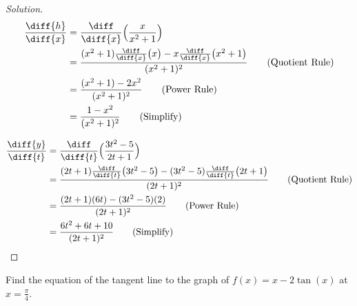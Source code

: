 \documentclass[crop=false,class=book,oneside]{standalone}                      %
\begin{document}
            \begin{proof}[Solution]
                \par\hfill\par
                \begin{minipage}[b]{.49\textwidth}
                    \centering
                    \begin{align*}
                        \frac{\diff{h}}{\diff{x}}
                        &=\frac{\diff}{\diff{x}}
                            \Big(\frac{x}{x^{2}+1}\Big)\\
                        &=\frac{(x^{2}+1)\frac{\diff}{\diff{x}}
                            \big(x\big)-x\frac{\diff}{\diff{x}}
                            \big(x^{2}+1\big)}
                              {(x^{2}+1)^{2}}
                            \tag{Quotient Rule}\\
                        &=\frac{(x^{2}+1)-2x^{2}}{(x^{2}+1)^{2}}
                            \tag{Power Rule}\\
                        &=\frac{1-x^{2}}{(x^{2}+1)^{2}}
                            \tag{Simplify}
                    \end{align*}
                \end{minipage}
                \hfill
                \vline
                \begin{minipage}[b]{.49\textwidth}
                    \centering
                    \begin{align*}
                        \frac{\diff{y}}{\diff{t}}
                        &=\frac{\diff}{\diff{t}}
                            \Big(\frac{3t^{2}-5}{2t+1}\Big)\\
                        &=\frac{(2t+1)\frac{\diff}{\diff{t}}
                                \big(3t^{2}-5\big)-(3t^{2}-5)
                                \frac{\diff}{\diff{t}}\big(2t+1\big)}
                               {{(2t+1)^{2}}}
                                \tag{Quotient Rule}\\
                        &=\frac{(2t+1)(6t)-(3t^{2}-5)(2)}
                               {(2t+1)^{2}}
                            \tag{Power Rule}\\
                        &=\frac{6t^{2}+6t+10}{(2t+1)^{2}}
                            \tag{Simplify}
                    \end{align*}
                \end{minipage}
            \end{proof}
            \begin{problem}
                Find the equation of the tangent line
                to the graph of $f(x)=x-2\tan(x)$
                at $x=\frac{\pi}{4}$.
            \end{problem}
\end{document}
